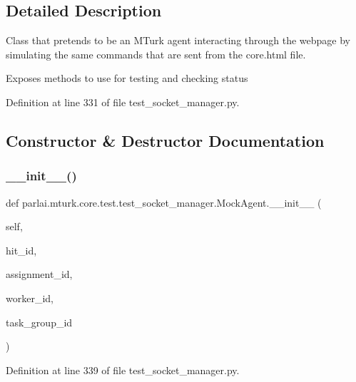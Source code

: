 \subsection{Detailed Description}
\begin{DoxyVerb}Class that pretends to be an MTurk agent interacting through the webpage by
simulating the same commands that are sent from the core.html file.

Exposes methods to use for testing and checking status
\end{DoxyVerb}
 

Definition at line 331 of file test\+\_\+socket\+\_\+manager.\+py.



\subsection{Constructor \& Destructor Documentation}
\mbox{\label{classparlai_1_1mturk_1_1core_1_1test_1_1test__socket__manager_1_1MockAgent_a9709b22bd2fbafc96e35b6c4dad827f8}} 
\subsubsection{\texorpdfstring{\+\_\+\+\_\+init\+\_\+\+\_\+()}{\_\_init\_\_()}}
{\footnotesize\ttfamily def parlai.\+mturk.\+core.\+test.\+test\+\_\+socket\+\_\+manager.\+Mock\+Agent.\+\_\+\+\_\+init\+\_\+\+\_\+ (\begin{DoxyParamCaption}\item[{}]{self,  }\item[{}]{hit\+\_\+id,  }\item[{}]{assignment\+\_\+id,  }\item[{}]{worker\+\_\+id,  }\item[{}]{task\+\_\+group\+\_\+id }\end{DoxyParamCaption})}



Definition at line 339 of file test\+\_\+socket\+\_\+manager.\+py.


